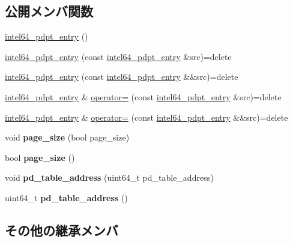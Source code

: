 \subsection*{公開メンバ関数}
\begin{DoxyCompactItemize}
\item 
\hyperlink{classintel64__pdpt__entry_a1bca60c1d1f0d72fa78c039afa32ddfc}{intel64\+\_\+pdpt\+\_\+entry} ()
\item 
\hyperlink{classintel64__pdpt__entry_aa8a51fe2f1c551dd8a545aa7aa07374c}{intel64\+\_\+pdpt\+\_\+entry} (const \hyperlink{classintel64__pdpt__entry}{intel64\+\_\+pdpt\+\_\+entry} \&src)=delete
\item 
\hyperlink{classintel64__pdpt__entry_a9385e9a2093e34b07499173da97ac2f6}{intel64\+\_\+pdpt\+\_\+entry} (const \hyperlink{classintel64__pdpt__entry}{intel64\+\_\+pdpt\+\_\+entry} \&\&src)=delete
\item 
\hyperlink{classintel64__pdpt__entry}{intel64\+\_\+pdpt\+\_\+entry} \& \hyperlink{classintel64__pdpt__entry_aadd1bbb0bbd4a6d4b12e6a5303c0da0c}{operator=} (const \hyperlink{classintel64__pdpt__entry}{intel64\+\_\+pdpt\+\_\+entry} \&src)=delete
\item 
\hyperlink{classintel64__pdpt__entry}{intel64\+\_\+pdpt\+\_\+entry} \& \hyperlink{classintel64__pdpt__entry_a7a41c3ce7324028364eca0871db3d505}{operator=} (const \hyperlink{classintel64__pdpt__entry}{intel64\+\_\+pdpt\+\_\+entry} \&\&src)=delete
\item 
\hypertarget{classintel64__pdpt__entry_a9a48fbdce2a03fb64760fa2287dd425e}{}\label{classintel64__pdpt__entry_a9a48fbdce2a03fb64760fa2287dd425e} 
void {\bfseries page\+\_\+size} (bool page\+\_\+size)
\item 
\hypertarget{classintel64__pdpt__entry_a4bb98ce432caf83c8aab9d1f8e854e33}{}\label{classintel64__pdpt__entry_a4bb98ce432caf83c8aab9d1f8e854e33} 
bool {\bfseries page\+\_\+size} ()
\item 
\hypertarget{classintel64__pdpt__entry_ad0f35f360bcdc337026d7483775145e5}{}\label{classintel64__pdpt__entry_ad0f35f360bcdc337026d7483775145e5} 
void {\bfseries pd\+\_\+table\+\_\+address} (uint64\+\_\+t pd\+\_\+table\+\_\+address)
\item 
\hypertarget{classintel64__pdpt__entry_ab707b8733d73c9dd77d7839780a09cd0}{}\label{classintel64__pdpt__entry_ab707b8733d73c9dd77d7839780a09cd0} 
uint64\+\_\+t {\bfseries pd\+\_\+table\+\_\+address} ()
\end{DoxyCompactItemize}
\subsection*{その他の継承メンバ}


